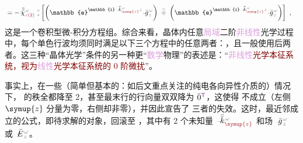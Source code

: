 \begin{subequations}
\begin{align}
	&= - \Xint{{}^{}_{\mathcolor{gray}{-}}}{23}{\bar{\bar{\bar{\chi}}}}^{\;\! \mathcolor{gray}{\omega}}_{\mathcolor{gray}{z} \textcolor{Maroon}{(2)}} ~{}^{\mathcolor{gray}{*}}_{\mathcolor{gray}{*}} \left[ \left( \mathbb{e}^{\mathbb{i} \Xint{\begin{smallmatrix} ~ \\ {}^{}_{\mathcolor{gray}{-}} \\ ~ \end{smallmatrix}}{15}{\bar{\bar{k}}}_{\textcolor{Maroon}{\symup{z}}}^{\;\! \mathcolor{gray}{\omega}} \mathcolor{gray}{z}} \Xint{{}^{}_{\mathcolor{gray}{-}}}{10}{\bar{g}}^{\;\!\mathcolor{gray}{\omega}}_{\;\! \mathcolor{gray}{z}} \right) ~\mathcolor{gray}{\widetilde \circledast}~ \left( \mathbb{e}^{\mathbb{i} \Xint{\begin{smallmatrix} ~ \\ {}^{}_{\mathcolor{gray}{-}} \\ ~ \end{smallmatrix}}{15}{\bar{\bar{k}}}_{\textcolor{Maroon}{\symup{z}}}^{\;\! \mathcolor{gray}{\omega}} \mathcolor{gray}{z}} \Xint{{}^{}_{\mathcolor{gray}{-}}}{10}{\bar{g}}^{\;\!\mathcolor{gray}{\omega}}_{\;\! \mathcolor{gray}{z}} \right) \right] \label{eq:nonlinear(2)-wave_wkrho-simplify6-V3} ~,
\end{align}
\end{subequations}
这是一个卷积型微-积分方程组。综合来看，晶体内任意\textcolor{Plum}{局域}二阶\textcolor{Plum}{非线性}光学过程中，每个单色行波均须同时满足以下三个方程中的任意两者：，且一般使用后两者。这三种“\textcolor{PineGreen}{晶体光学}”条件的另一种更“\textcolor{Plum}{数学}\textcolor{NavyBlue}{物理}”的表述是：“\textcolor{Maroon}{\textcolor{Plum}{非线性}光学本征系统，视为\textcolor{Plum}{线性}光学本征系统的 \textcolor{NavyBlue}{0 阶微扰}}”。

事实上，在一些（简单但基本的：如后文重点关注的\textcolor{PineGreen}{纯电各向异性}介质的）情况下， 的秩全都降至 2，甚至最末行的行向量双双降为 $\bar{0}^{\mathsf{\textcolor{Plum}{T}}}$，这使得  不成立（左侧 $\symup{z}$ 分量为零，右侧却非零），并因此宣告了  三者的失效。这时，最近邻成立的公式，即待求解的对象，回滚至 ，其中有 2 个未知量 $\Xint{\begin{smallmatrix} ~ \\ {}^{}_{\mathcolor{gray}{-}} \\ ~ \end{smallmatrix}}{15}{\bar{\bar{k}}}_{\textcolor{Maroon}{\symup{z}}}^{\;\! \mathcolor{gray}{\omega}}$ 和场 $\Xint{{}^{}_{\mathcolor{gray}{-}}}{10}{\bar{g}}^{\;\!\mathcolor{gray}{\omega}}_{\;\! \mathcolor{gray}{z}}$ 或 $\Xint{\mathcolor{gray}{-}}{25}{\bar{E}}^{\;\!\mathcolor{gray}{\omega}}_{\;\! \mathcolor{gray}{z}}$。


